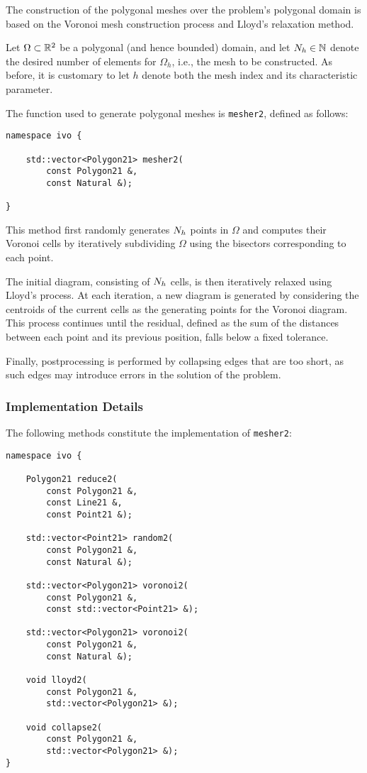 The construction of the polygonal meshes over the problem's polygonal domain is based on the Voronoi mesh construction process and Lloyd's relaxation method.

Let $\Omega \subset \mathbb{R}^{2}$ be a polygonal (and hence bounded) domain, and let $N_h \in \mathbb{N}$ denote the desired number of elements for $\Omega_h$, i.e., the mesh to be constructed. As before, it is customary to let $h$ denote both the mesh index and its characteristic parameter.

The function used to generate polygonal meshes is \lstinline{mesher2}, defined as follows:

\begin{lstlisting}[style=cpp]
namespace ivo {

    std::vector<Polygon21> mesher2(
        const Polygon21 &, 
        const Natural &);

}
\end{lstlisting}

This method first randomly generates $N_h$ points in $\Omega$ and computes their Voronoi cells by iteratively subdividing $\Omega$ using the bisectors corresponding to each point.

The initial diagram, consisting of $N_h$ cells, is then iteratively relaxed using Lloyd's process. At each iteration, a new diagram is generated by considering the centroids of the current cells as the generating points for the Voronoi diagram. This process continues until the residual, defined as the sum of the distances between each point and its previous position, falls below a fixed tolerance.

Finally, postprocessing is performed by collapsing edges that are too short, as such edges may introduce errors in the solution of the problem.

\newpage
\subsubsection{Implementation Details}

The following methods constitute the implementation of \lstinline{mesher2}:

\begin{lstlisting}[style=cpp]
namespace ivo {

	Polygon21 reduce2(
		const Polygon21 &, 
		const Line21 &, 
		const Point21 &);

	std::vector<Point21> random2(
		const Polygon21 &, 
		const Natural &);

	std::vector<Polygon21> voronoi2(
		const Polygon21 &, 
		const std::vector<Point21> &);

	std::vector<Polygon21> voronoi2(
		const Polygon21 &, 
		const Natural &);

	void lloyd2(
		const Polygon21 &, 
		std::vector<Polygon21> &);

	void collapse2(
		const Polygon21 &, 
		std::vector<Polygon21> &);
}
\end{lstlisting}

